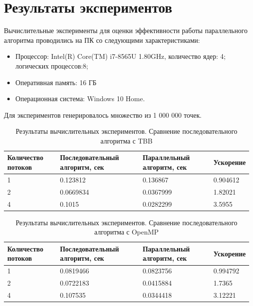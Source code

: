 \documentclass{report}
\begin{document}
\section*{Результаты экспериментов}
Вычислительные эксперименты для оценки эффективности работы параллельного алгоритма проводились на ПК со следующими характеристиками:
\begin{itemize}
\item Процессор: Intel(R) Core(TM) i7-8565U 1.80GHz, количество ядер: 4; логических процессов:8;
\item Оперативная память: 16 ГБ
\item Операционная система: Windows 10 Home.
\end{itemize}
\par Для экспериментов генерировалось множество из 1 000 000 точек.
\begin{table}[!h]
\caption{Результаты вычислительных экспериментов. Сравнение последовательного алгоритма с TBB}
\centering
\begin{tabular}{|p{4cm}|p{4cm}|p{4cm}|p{4cm}|}
\hline
Количество потоков & Последовательный алгоритм, сек & Параллельный алгоритм, сек & Ускорение  \\\hline
1 & 0.123812 &  0.136867 & 0.904612  \\\hline
2 & 0.0669834 & 0.0367999 & 1.82021  \\\hline
4 & 0.1015 & 0.0282299 & 3.5955  \\
\hline
\end{tabular}
\end{table}

\begin{table}[!h]
\caption{Результаты вычислительных экспериментов. Сравнение последовательного алгоритма с OpenMP}
\centering
\begin{tabular}{|p{4cm}|p{4cm}|p{4cm}|p{4cm}|}
\hline
Количество потоков & Последовательный алгоритм, сек & Параллельный алгоритм, сек & Ускорение  \\\hline
1 & 0.0819466 &  0.0823756 & 0.994792  \\\hline
2 & 0.0722183 & 0.0415884 & 1.7365  \\\hline
4 & 0.107535 & 0.0344418 & 3.12221  \\
\hline
\end{tabular}
\end{table}

\newpage

\end{document}
